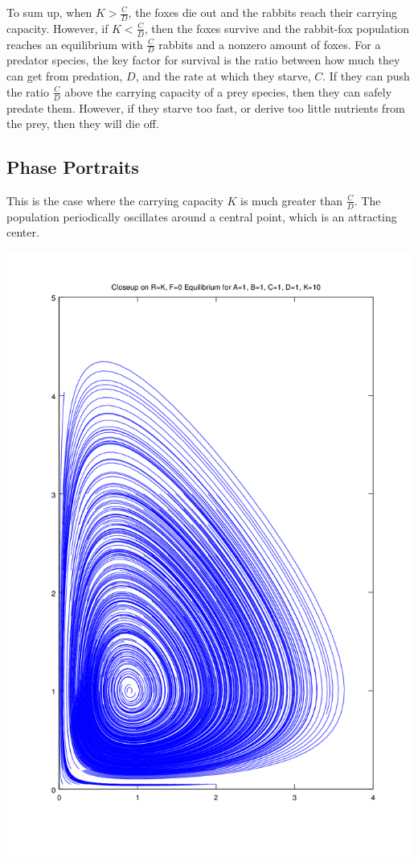 \documentclass{article}
\begin{document}
To sum up, when $K > \frac{C}{D}$, the foxes die out and the
	rabbits reach their carrying capacity.
However, if $K < \frac{C}{D}$, then the foxes survive
	and the rabbit-fox population reaches an equilibrium
	with $\frac{C}{D}$ rabbits and a nonzero amount of foxes.
For a predator species, the key factor for survival is the ratio
	between how much they can get from predation, $D$,
	and the rate at which they starve, $C$.
If they can push the ratio $\frac{C}{D}$ above the carrying capacity
	of a prey species, then they can safely predate them.
However, if they starve too fast, or derive too little nutrients
	from the prey, then they will die off.

\subsection{Phase Portraits}

This is the case where the carrying capacity $K$ is much greater than
	$\frac{C}{D}$.
The population periodically oscillates around a central point,
	which is an attracting center.

\includegraphics[width=\textwidth]{plots/phase-potrait.png}
\end{document}
